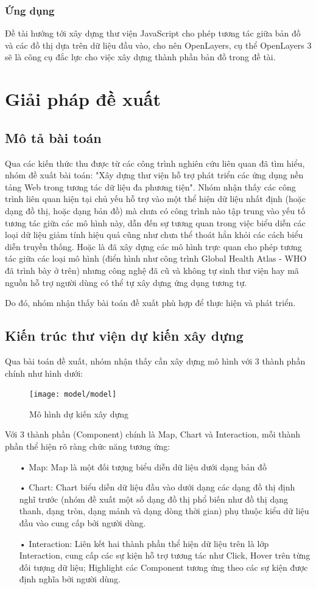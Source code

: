 \documentclass[12pt,a4paper,oneside]{article}
\begin{document}
\subsubsection{Ứng dụng}
Đề tài hướng tới xây dựng thư viện JavaScript cho phép tương tác giữa bản đồ và các đồ thị dựa trên dữ liệu đầu vào, cho nên OpenLayers, cụ thể OpenLayers 3 sẽ là công cụ đắc lực cho việc xây dựng thành phần bản đồ trong đề tài. 


\section{Giải pháp đề xuất}
\subsection{Mô tả bài toán}
Qua các kiến thức thu được từ các công trình nghiên cứu liên quan đã tìm hiểu, nhóm đề xuất bài toán: "Xây dựng thư viện hỗ trợ phát triển các ứng dụng nền tảng Web trong tương tác dữ liệu đa phương tiện". Nhóm nhận thấy các công trình liên quan hiện tại chủ yếu hỗ trợ vào một thể hiện dữ liệu nhất định (hoặc dạng đồ thị, hoặc dạng bản đồ) mà chưa có công trình nào tập trung vào yếu tố tương tác giữa các mô hình này, dẫn đến sự tương quan trong việc biểu diễn các loại dữ liệu giảm tính hiệu quả cũng như chưa thể thoát hẳn khỏi các cách biểu diễn truyền thống. Hoặc là đã  xây dựng các mô hình trực quan cho phép tương tác giữa các loại mô hình (điển hình như công trình Global Health Atlas - WHO đã trình bày ở trên) nhưng công nghệ đã cũ và không tự sinh thư viện hay mã nguồn hỗ trợ người dùng có thể tự xây dựng ứng dụng tương tự.

Do đó, nhóm nhận thấy bài toán đề xuất phù hợp để thực hiện và phát triển.

\subsection{Kiến trúc thư viện dự kiến xây dựng}
Qua bài toán đề xuất, nhóm nhận thấy cần xây dựng mô hình với 3 thành phần chính như hình dưới:

\begin{figure}[htp]
    \texttt{[image: model/model]}
    \caption{Mô hình dự kiến xây dựng}
    \label{refhinh16}
\end{figure}

Với 3 thành phần (Component) chính là Map, Chart và Interaction, mỗi thành phần thể hiện rõ ràng chức năng tương ứng: 
\begin{itemize}
\item[•] Map: 
Map là một đối tượng biểu diễn dữ liệu dưới dạng bản đồ
\item[•] Chart:
Chart biểu diễn dữ liệu đầu vào dưới dạng các dạng đồ thị định nghĩ trước (nhóm đề xuất một số dạng đồ thị phổ biến như đồ thị dạng thanh, dạng tròn, dạng mảnh và dạng dòng thời gian) phụ thuộc kiểu dữ liệu đầu vào cung cấp bởi người dùng.
\item[•] Interaction:
Liên kết hai thành phần thể hiện dữ liệu trên là lớp Interaction, cung cấp các sự kiện hỗ trợ tương tác như Click, Hover trên từng đối tượng dữ liệu; Highlight các Component tương ứng theo các sự kiện được định nghĩa bởi người dùng.
\end{itemize}
\end{document}
